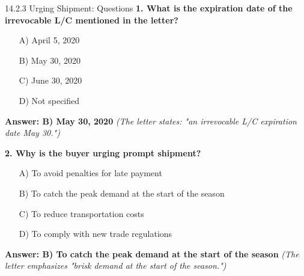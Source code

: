 \documentclass[12pt]{beamer}
\begin{document}
    \begin{frame}[allowframebreaks]{14.2.3 Urging Shipment: Questions}
        \textcolor{myblue}{\textbf{1. What is the expiration date of the irrevocable L/C mentioned in the letter?}}  
        \begin{itemize}
        \item[A)] April 5, 2020  
        \item[B)] \textcolor{myred}{May 30, 2020}  
        \item[C)] June 30, 2020  
        \item[D)] Not specified  
        \end{itemize}
        
        \textcolor{myblue}{\textbf{Answer: B) May 30, 2020}}  
        \footnotesize\textit{(The letter states: "an irrevocable L/C expiration date May 30.")}
        
        \vspace{0.5cm}
        \textcolor{myblue}{\textbf{2. Why is the buyer urging prompt shipment?}}  
        \begin{itemize}
        \item[A)] To avoid penalties for late payment  
        \item[B)] \textcolor{myred}{To catch the peak demand at the start of the season}  
        \item[C)] To reduce transportation costs  
        \item[D)] To comply with new trade regulations  
        \end{itemize}
        
        \textcolor{myblue}{\textbf{Answer: B) To catch the peak demand at the start of the season}}  
        \footnotesize\textit{(The letter emphasizes "brisk demand at the start of the season.")}
        \end{frame}
        
\end{document}
